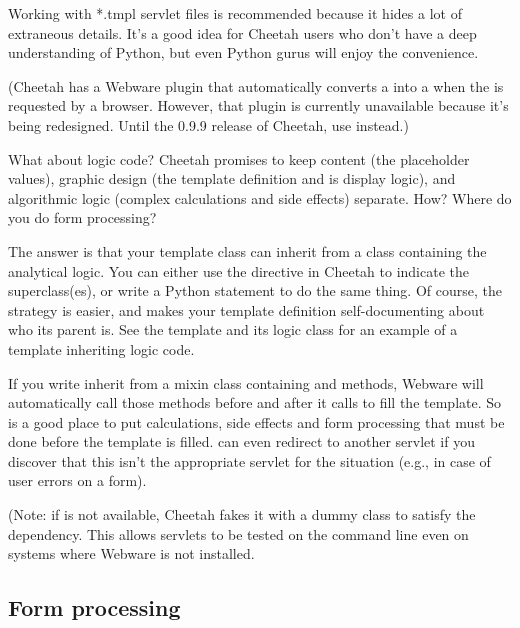 Working with *.tmpl servlet files is recommended because it hides a lot of
extraneous details.  It's a good idea for Cheetah users who don't have a deep
understanding of Python, but even Python gurus will enjoy the convenience.

(Cheetah has a Webware plugin that automatically converts a  into a  when the  is
requested by a browser.  However, that plugin is currently unavailable because
it's being redesigned.  Until the 0.9.9 release of Cheetah, use
 instead.)

What about logic code?  Cheetah promises to keep content (the placeholder
values), graphic design (the template definition and is display logic), and
algorithmic logic (complex calculations and side effects) separate.  How?
Where do you do form processing?

The answer is that your template class can inherit from a class containing
the analytical logic.  You can either use the  directive in
Cheetah to indicate the superclass(es), or write a Python 
statement to do the same thing.  Of course, the  strategy is
easier, and makes your template definition self-documenting about who its
parent is.  See the template  and its
logic class  for an example of 
a template inheriting logic code.

If you write inherit from a mixin class containing  and 
 methods, Webware will automatically call those methods before
and after it calls  to fill the template.  So 
 is a good place to put calculations, side effects and 
form processing that must be done before the template is filled.
 can even redirect to another servlet if you discover that this
isn't the appropriate servlet for the situation (e.g., in case of user errors
on a form).  

(Note: if  is not available, Cheetah fakes it with a
dummy class to satisfy the dependency.  This allows servlets to be tested on
the command line even on systems where Webware is not installed.

\subsection{Form processing}
\label{webware.form}

